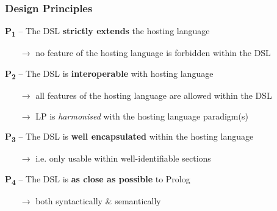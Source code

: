 \documentclass[presentation]{beamer}
\begin{document}
\begin{frame}%
    \frametitle{Design Principles}

    \begin{block}{\textbf{P\textsubscript{1}} -- The DSL \textbf{strictly extends} the hosting language}
        \begin{itemize}
            \item[$\rightarrow$] no feature of the hosting language is forbidden within the DSL
        \end{itemize}
    \end{block}

    \begin{block}{\textbf{P\textsubscript{2}} -- The DSL is \textbf{interoperable} with hosting language}
        \begin{itemize}
            \item[$\rightarrow$] all features of the hosting language are allowed within the DSL
            \item[$\rightarrow$] LP is \emph{harmonised} with the hosting language paradigm(s)
        \end{itemize}
    \end{block}

    \begin{block}{\textbf{P\textsubscript{3}} -- The DSL is \textbf{well encapsulated} within the hosting language}
        \begin{itemize}
            \item[$\rightarrow$] i.e. only usable within well-identifiable sections
        \end{itemize}
    \end{block}

    \begin{block}{\textbf{P\textsubscript{4}} -- The DSL is \textbf{as close as possible} to Prolog}
        \begin{itemize}
            \item[$\rightarrow$] both syntactically \& semantically
        \end{itemize}
    \end{block}

\end{frame}
\end{document}
